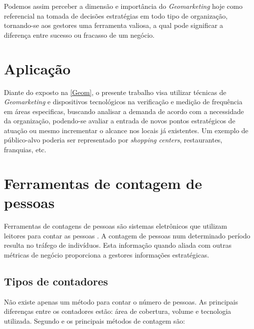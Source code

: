 Podemos assim perceber a dimensão e importância do \emph{Geomarketing} hoje como
referencial na tomada de decisões estratégias em todo tipo de organização,
tornando-se aos gestores uma ferramenta valiosa,  a qual pode significar a
diferença entre sucesso ou fracasso de um negócio.

\section{Aplicação}
Diante do exposto na \autoref{Geom}, o presente trabalho
visa utilizar técnicas de \emph{Geomarketing} e dispositivos tecnológicos na
verificação e medição de frequência em áreas especificas, buscando analisar a
demanda de acordo com a necessidade da organização, podendo-se avaliar a entrada
de novos pontos estratégicos de atuação ou mesmo incrementar o alcance nos
locais já existentes. Um exemplo de público-alvo poderia ser representado por
\emph{shopping centers}, restaurantes, franquias, etc.

\section{Ferramentas de contagem de pessoas}
Ferramentas de contagens de pessoas
são sistemas eletrônicos que utilizam leitores para contar as pessoas
\cite{trafsysdef}. A contagem de pessoas num determinado período resulta no
tráfego de indivíduos. Esta informação quando aliada com outras métricas de
negócio proporciona a gestores informações estratégicas.

\subsection{Tipos de contadores}
Não existe apenas um método para contar o número de pessoas. As principais
diferenças entre os contadores estão: área de cobertura, volume e tecnologia
utilizada. Segundo  e  os principais métodos de
contagem são:

